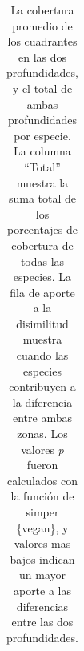 \documentclass[
  authoryear,
  preprint,
  3p,
  twocolumn]{elsarticle}
\begin{document}
\begin{longtable}[t]{>{\raggedright\arraybackslash}p{0.7cm}>{\raggedright\arraybackslash}p{0.7cm}>{\raggedright\arraybackslash}p{0.7cm}>{\raggedright\arraybackslash}p{0.7cm}>{\raggedright\arraybackslash}p{0.7cm}>{\raggedright\arraybackslash}p{0.7cm}>{\raggedright\arraybackslash}p{0.7cm}>{\raggedright\arraybackslash}p{0.7cm}>{\raggedright\arraybackslash}p{0.7cm}}

\caption{\label{tbl-2}La cobertura promedio de los cuadrantes en las dos
profundidades, y el total de ambas profundidades por especie. La columna
``Total'' muestra la suma total de los porcentajes de cobertura de todas
las especies. La fila de aporte a la disimilitud muestra cuando las
especies contribuyen a la diferencia entre ambas zonas. Los valores
\emph{p} fueron calculados con la función de simper \{vegan\}, y valores
mas bajos indican un mayor aporte a las diferencias entre las dos
profundidades.}

\tabularnewline


\end{longtable}
\end{document}
